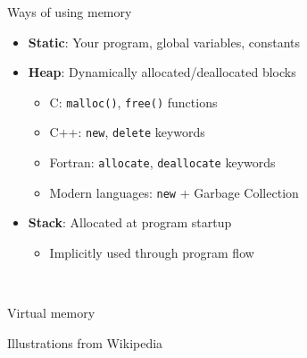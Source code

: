 \documentclass[sans,mathserif]{beamer}
\begin{document}
\begin{frame}{Ways of using memory}

  \begin{itemize}
  \item<+-> {\bf Static}: Your program, global variables, constants
  \item<+-> {\bf Heap}: Dynamically allocated/deallocated blocks
    \begin{itemize}
    \item C: {\tt malloc()}, {\tt free()} functions
    \item C++: {\tt new}, {\tt delete} keywords
    \item Fortran: {\tt allocate}, {\tt deallocate} keywords
    \item Modern languages: {\tt new} + Garbage Collection
    \end{itemize}
  \item<+-> {\bf Stack}: Allocated at program startup
    \begin{itemize}
    \item Implicitly used through program flow
    \end{itemize}
  \end{itemize}

~


\end{frame}

\begin{frame}{Virtual memory}
{\tiny Illustrations from Wikipedia}
\end{frame}
\end{document}
